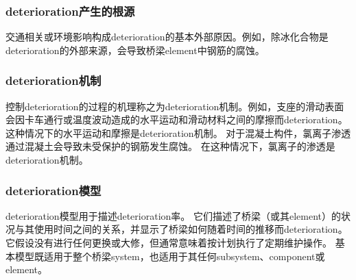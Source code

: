 \subsubsection*{\gls*{deterioration}产生的根源}
交通相关或环境影响构成\gls*{deterioration}的基本外部原因。例如，除冰化合物是\gls*{deterioration}的外部来源，会导致桥梁\gls{element}中钢筋的腐蚀。

\subsubsection*{\gls*{deterioration}机制}
控制\gls*{deterioration}的过程的机理称之为\gls*{deterioration}机制。例如，支座的滑动表面会因卡车通行或温度波动造成的水平运动和滑动材料之间的摩擦而\gls*{deterioration}。 这种情况下的水平运动和摩擦是\gls*{deterioration}机制。 对于混凝土构件，氯离子渗透通过混凝土会导致未受保护的钢筋发生腐蚀。 在这种情况下，氯离子的渗透是\gls*{deterioration}机制。

\subsubsection*{\gls*{deterioration}模型}
\gls*{deterioration}模型用于描述\gls*{deterioration}率。 它们描述了桥梁（或其\gls*{element}）的状况与其使用时间之间的关系，并显示了桥梁如何随着时间的推移而\gls*{deterioration}。 它假设没有进行任何更换或大修，但通常意味着按计划执行了定期维护操作。 基本模型既适用于整个桥梁\gls*{system}，也适用于其任何\gls*{subsystem}、\gls*{component}或\gls*{element}。

